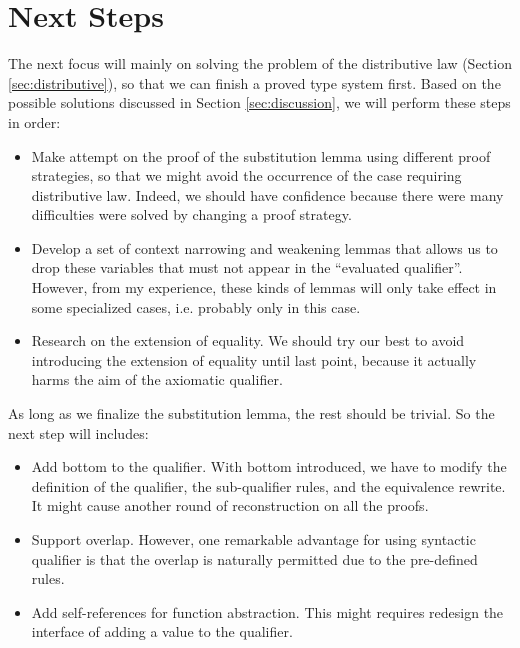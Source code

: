 \section{Next Steps} \label{sec:next-step}

The next focus will mainly on solving the problem of the distributive law (Section \ref{sec:distributive}), so that we can finish a proved type system first. Based on the possible solutions discussed in Section \ref{sec:discussion}, we will perform these steps in order:
\begin{itemize}
    \item Make attempt on the proof of the substitution lemma using different proof strategies, so that we might avoid the occurrence of the case requiring distributive law. Indeed, we should have confidence because there were many difficulties were solved by changing a proof strategy. 
    \item Develop a set of context narrowing and weakening lemmas that allows us to drop these variables that must not appear in the ``evaluated qualifier''. However, from my experience, these kinds of lemmas will only take effect in some specialized cases, i.e. probably only in this case.
    \item Research on the extension of equality. We should try our best to avoid introducing the extension of equality until last point, because it actually harms the aim of the axiomatic qualifier.
\end{itemize}

As long as we finalize the substitution lemma, the rest should be trivial. So the next step will includes:
\begin{itemize}
    \item Add bottom to the qualifier. With bottom introduced, we have to modify the definition of the qualifier, the sub-qualifier rules, and the equivalence rewrite. It might cause another round of reconstruction on all the proofs.
    \item Support overlap. However, one remarkable advantage for using syntactic qualifier is that the overlap is naturally permitted due to the pre-defined rules.
    \item Add self-references for function abstraction. This might requires redesign the interface of adding a value to the qualifier.
\end{itemize}